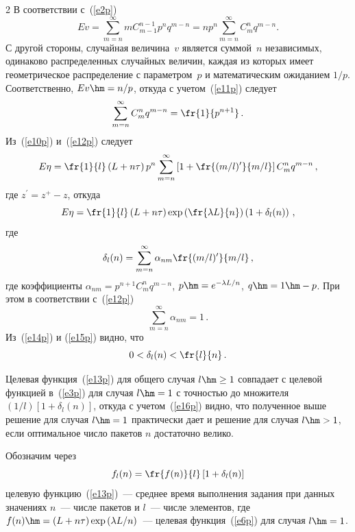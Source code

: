 \begin{multicols}{2}
В соответствии с~(\ref{e2p}) 
\begin{equation}
E v = \!\sum\limits_{m=n}^\infty m C_{m-1}^{n-1} p^n q^{m-n} =n p^n\! 
\sum\limits_{m=n}^\infty C_m^n q^{m-n}.
\label{e11p}
\end{equation}
С другой стороны, случайная величина~$v$ является суммой~$n$ 
независимых, одинаково распределенных случайных величин, каждая из 
которых имеет геометрическое распределение с параметром~$p$ и 
математическим ожиданием $1/p$. Соответственно, $Ev \hm= n/p$, откуда с 
учетом~(\ref{e11p}) следует 
\begin{equation}
\sum\limits_{m=n}^\infty C_m^n q^{m-n} =\fr{1}{p^{n+1}}\,.
\label{e12p}
\end{equation}
Из~(\ref{e10p}) и~(\ref{e12p}) следует
$$
E\eta = \fr{1}{l}\left( L+n\tau\right) p^n \sum\limits_{m=n}^\infty \left[ 
1+\fr{(m/l)^\prime}{m/l}\right] C_m^n q^{m-n}\,,
$$
где $z^\prime=z^+-z$, откуда
\begin{equation}
E\eta =\fr{1}{l}\left(L+n\tau\right)\exp \left( \fr{\lambda L}{n}\right) 
\left(1+\delta_l(n)\right)\,,
\label{e13p}
\end{equation}
где 
\begin{equation}
\delta_l(n)=\sum\limits_{m=n}^\infty \alpha_{nm} \fr{(m/l)^\prime}{m/l}\,,
\label{e14p}
\end{equation}
где коэффициенты $\alpha_{nm} =p^{n+1} C_m^n q^{m-n}$, $p\hm= e^{-
\lambda L/n}$, $q\hm=1\hm-p$. При этом в соответствии с~(\ref{e12p}) 
\begin{equation}
\sum\limits_{m=n}^\infty \alpha_{nm}=1\,.
\label{e15p}
\end{equation}
Из~(\ref{e14p}) и (\ref{e15p}) видно, что 
\begin{equation}
0<\delta_l(n)<\fr{l}{n}\,.
\label{e16p}
\end{equation}
     
     Целевая функция~(\ref{e13p}) для общего случая $l\hm\geq 1$ 
совпадает с целевой функцией в~(\ref{e3p}) для случая $l\hm=1$ с точностью 
до множителя $(1/l)\left[ 1+\delta_l(n)\right]$, откуда с учетом~(\ref{e16p}) 
видно, что полученное выше решение для случая $l\hm=1$ практически дает 
и решение для случая $l\hm>1$, если оптимальное число пакетов $n$ 
достаточно велико.
     
     Обозначим через
     \begin{equation}
     f_l(n) =\fr{f(n)}{l}\left[ 1+\delta_l(n)\right]
     \label{e17p}
     \end{equation}
целевую функцию~(\ref{e13p})~--- среднее время выполнения задания при 
данных значениях $n$~--- чис\-ле пакетов и $l$~--- чис\-ле элементов, где 
$f(n)\hm=(L+n\tau)\exp\left(\lambda L/n\right)$~--- целевая функция~(\ref{e6p}) 
для случая $l\hm=1$.
     

\end{multicols}
